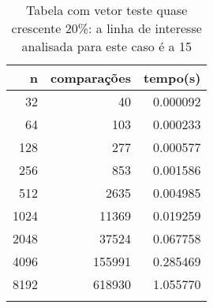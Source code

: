 \begin{table}[ht]
\centering
\begin{tabular}{rrr} \toprule
        n &    comparações &       tempo(s) \\ \midrule
      32  &             40 &      0.000092 \\
      64  &            103 &      0.000233 \\
     128  &            277 &      0.000577 \\
     256  &            853 &      0.001586 \\
     512  &           2635 &      0.004985 \\
    1024  &          11369 &      0.019259 \\
    2048  &          37524 &      0.067758 \\
    4096  &         155991 &      0.285469 \\
    8192  &         618930 &      1.055770 \\
\bottomrule\addlinespace
\end{tabular}
\caption{Tabela com vetor teste quase crescente 20\%: a linha de interesse analisada para este caso é a 15}
\label{tab:insertionsortQuaseCresc20}
\end{table}
